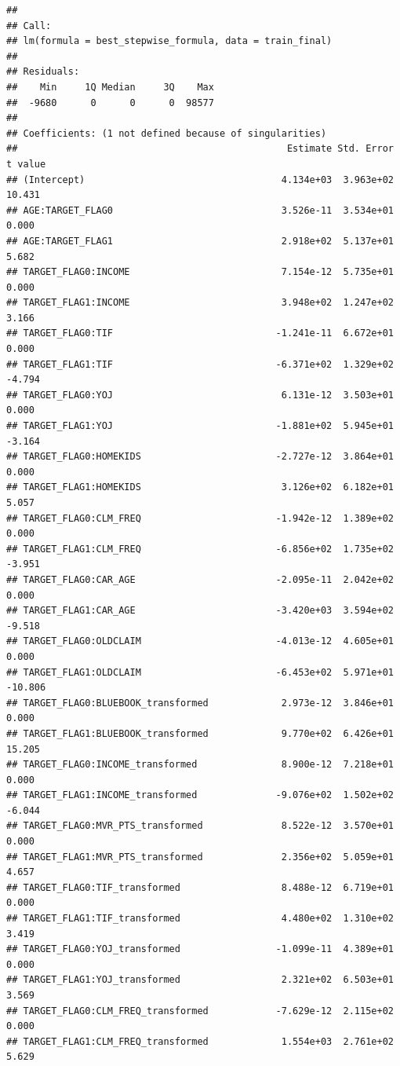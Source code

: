 \documentclass[
]{article}
\begin{document}
\begin{verbatim}
## 
## Call:
## lm(formula = best_stepwise_formula, data = train_final)
## 
## Residuals:
##    Min     1Q Median     3Q    Max 
##  -9680      0      0      0  98577 
## 
## Coefficients: (1 not defined because of singularities)
##                                                Estimate Std. Error t value
## (Intercept)                                   4.134e+03  3.963e+02  10.431
## AGE:TARGET_FLAG0                              3.526e-11  3.534e+01   0.000
## AGE:TARGET_FLAG1                              2.918e+02  5.137e+01   5.682
## TARGET_FLAG0:INCOME                           7.154e-12  5.735e+01   0.000
## TARGET_FLAG1:INCOME                           3.948e+02  1.247e+02   3.166
## TARGET_FLAG0:TIF                             -1.241e-11  6.672e+01   0.000
## TARGET_FLAG1:TIF                             -6.371e+02  1.329e+02  -4.794
## TARGET_FLAG0:YOJ                              6.131e-12  3.503e+01   0.000
## TARGET_FLAG1:YOJ                             -1.881e+02  5.945e+01  -3.164
## TARGET_FLAG0:HOMEKIDS                        -2.727e-12  3.864e+01   0.000
## TARGET_FLAG1:HOMEKIDS                         3.126e+02  6.182e+01   5.057
## TARGET_FLAG0:CLM_FREQ                        -1.942e-12  1.389e+02   0.000
## TARGET_FLAG1:CLM_FREQ                        -6.856e+02  1.735e+02  -3.951
## TARGET_FLAG0:CAR_AGE                         -2.095e-11  2.042e+02   0.000
## TARGET_FLAG1:CAR_AGE                         -3.420e+03  3.594e+02  -9.518
## TARGET_FLAG0:OLDCLAIM                        -4.013e-12  4.605e+01   0.000
## TARGET_FLAG1:OLDCLAIM                        -6.453e+02  5.971e+01 -10.806
## TARGET_FLAG0:BLUEBOOK_transformed             2.973e-12  3.846e+01   0.000
## TARGET_FLAG1:BLUEBOOK_transformed             9.770e+02  6.426e+01  15.205
## TARGET_FLAG0:INCOME_transformed               8.900e-12  7.218e+01   0.000
## TARGET_FLAG1:INCOME_transformed              -9.076e+02  1.502e+02  -6.044
## TARGET_FLAG0:MVR_PTS_transformed              8.522e-12  3.570e+01   0.000
## TARGET_FLAG1:MVR_PTS_transformed              2.356e+02  5.059e+01   4.657
## TARGET_FLAG0:TIF_transformed                  8.488e-12  6.719e+01   0.000
## TARGET_FLAG1:TIF_transformed                  4.480e+02  1.310e+02   3.419
## TARGET_FLAG0:YOJ_transformed                 -1.099e-11  4.389e+01   0.000
## TARGET_FLAG1:YOJ_transformed                  2.321e+02  6.503e+01   3.569
## TARGET_FLAG0:CLM_FREQ_transformed            -7.629e-12  2.115e+02   0.000
## TARGET_FLAG1:CLM_FREQ_transformed             1.554e+03  2.761e+02   5.629

\end{verbatim}
\end{document}

